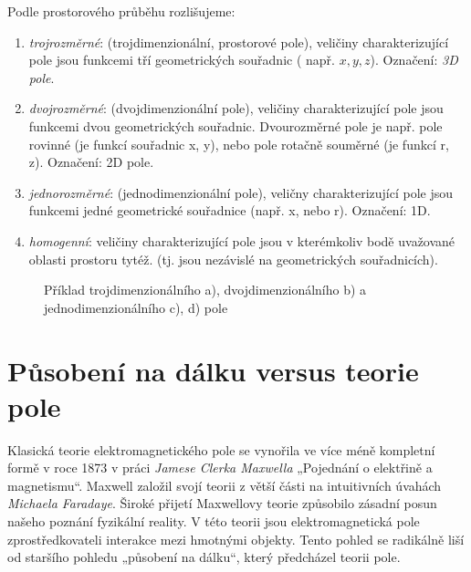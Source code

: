     Podle prostorového průběhu rozlišujeme:
    \begin{enumerate}[noitemsep]
      \item \emph{trojrozměrné}: (trojdimenzionální, prostorové pole), veličiny
            charakterizující pole jsou funkcemi tří geometrických souřadnic ( např. $x, y, z$).
            Označení: \emph{3D pole}.
      \item \emph{dvojrozměrné}: (dvojdimenzionální pole), veličiny charakterizující pole jsou
            funkcemi dvou  geometrických souřadnic. Dvourozměrné pole je např. pole rovinné (je
            funkcí souřadnic x, y), nebo pole rotačně souměrné (je funkcí r, z). Označení: 2D
            pole.
      \item \emph{jednorozměrné}: (jednodimenzionální pole), veličny charakterizující pole jsou
            funkcemi jedné geometrické souřadnice (např. x, nebo r). Označení: 1D.
      \item \emph{homogenní}: veličiny charakterizující pole jsou v kterémkoliv bodě uvažované
            oblasti prostoru tytéž. (tj. jsou nezávislé na geometrických souřadnicích).
    \end{enumerate}      
    \begin{figure}[ht!]
      \centering
        {}          \hspace{1em}            
        {}                      \newline
        {}          \hspace{1em}              
        {}                       
      \caption{Příklad trojdimenzionálního a), dvojdimenzionálního b) a jednodimenzionálního c), 
               d) pole}
      \label{fyz:fig221}
    \end{figure} 
         
  \section{Působení na dálku versus teorie pole}
    Klasická teorie elektromagnetického pole se vynořila ve více méně kompletní formě v roce 1873 v 
    práci \emph{Jamese Clerka Maxwella} „Pojednání o elektřině a magnetismu“. Maxwell založil svojí 
    teorii z větší části na intuitivních úvahách \emph{Michaela Faradaye}. Široké přijetí 
    Maxwellovy teorie způsobilo zásadní posun našeho poznání fyzikální reality. V této teorii jsou 
    elektromagnetická pole zprostředkovateli interakce mezi hmotnými objekty. Tento pohled se 
    radikálně liší od staršího pohledu „působení na dálku“, který předcházel teorii pole.
  
